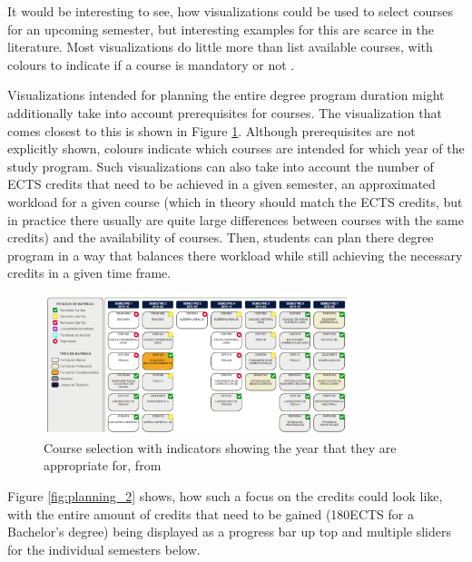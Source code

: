 It would be interesting to see, how visualizations could be used to select courses for an upcoming semester, but interesting examples for this are scarce in the literature. Most visualizations do little more than list available courses, with colours to indicate if a course is mandatory or not \cite{Dashboard-StudentProgress}.

Visualizations intended for planning the entire degree program duration might additionally take into account prerequisites for courses. The visualization that comes closest to this is shown in Figure \ref{fig:planning}. Although prerequisites are not explicitly shown, colours indicate which courses are intended for which year of the study program.
Such visualizations can also take into account the number of ECTS credits that need to be achieved in a given semester, an approximated workload for a given course (which in theory should match the ECTS credits, but in practice there usually are quite large differences between courses with the same credits) and the availability of courses. Then, students can plan there degree program in a way that balances there workload while still achieving the necessary credits in a given time frame.

\begin{figure}
    \centering
    \includegraphics[width=0.8\textwidth]{figures/planning.png}
    \caption{Course selection with indicators showing the year that they are appropriate for, from \cite{LISSA-Planning}}
    \label{fig:planning}
\end{figure}



Figure \ref{fig:planning_2} shows, how such a focus on the credits could look like, with the entire amount of credits that need to be gained (180ECTS for a Bachelor's degree) being displayed as a progress bar up top and multiple sliders for the individual semesters below.

